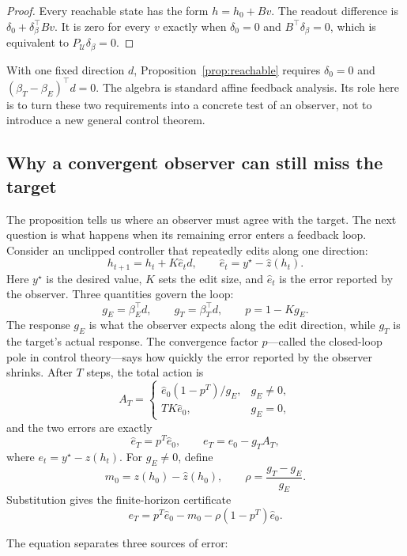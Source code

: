 \begin{proof}
Every reachable state has the form $h=h_0+Bv$. The readout difference is
$\delta_0+\delta_\beta^\top Bv$. It is zero for every $v$ exactly when
$\delta_0=0$ and $B^\top\delta_\beta=0$, which is equivalent to
$P_{\mathcal U}\delta_\beta=0$.
\end{proof}

With one fixed direction $d$, Proposition~\ref{prop:reachable} requires
$\delta_0=0$ and $(\beta_T-\beta_E)^\top d=0$.
The algebra is standard affine feedback analysis. Its role here is to turn
these two requirements into a concrete test of an observer, not to introduce
a new general control theorem.

\subsection{Why a convergent observer can still miss the target}

The proposition tells us where an observer must agree with the target. The
next question is what happens when its remaining error enters a feedback loop.
Consider an unclipped controller that repeatedly edits along one direction:
\[
h_{t+1}=h_t+K\widehat e_t d,
\qquad
\widehat e_t=y^\star-\widehat z(h_t).
\]
Here $y^\star$ is the desired value, $K$ sets the edit size, and
$\widehat e_t$ is the error reported by the observer. Three quantities govern
the loop:
\[
g_E=\beta_E^\top d,
\qquad
g_T=\beta_T^\top d,
\qquad
p=1-Kg_E.
\]
The response $g_E$ is what the observer expects along the edit direction, while
$g_T$ is the target's actual response. The convergence factor $p$---called the
closed-loop pole in control theory---says how quickly the error reported by the
observer shrinks. After $T$ steps, the total action is
\[
A_T=
\begin{cases}
\widehat e_0(1-p^T)/g_E, & g_E\neq0,\\
TK\widehat e_0, & g_E=0,
\end{cases}
\]
and the two errors are exactly
\[
\widehat e_T=p^T\widehat e_0,
\qquad
e_T=e_0-g_T A_T,
\]
where $e_t=y^\star-z(h_t)$. For $g_E\neq0$, define
\[
m_0=z(h_0)-\widehat z(h_0),
\qquad
\rho=\frac{g_T-g_E}{g_E}.
\]
Substitution gives the finite-horizon certificate
\begin{equation}
\label{eq:certificate}
e_T=p^T\widehat e_0-m_0-\rho(1-p^T)\widehat e_0.
\end{equation}

The equation separates three sources of error:


